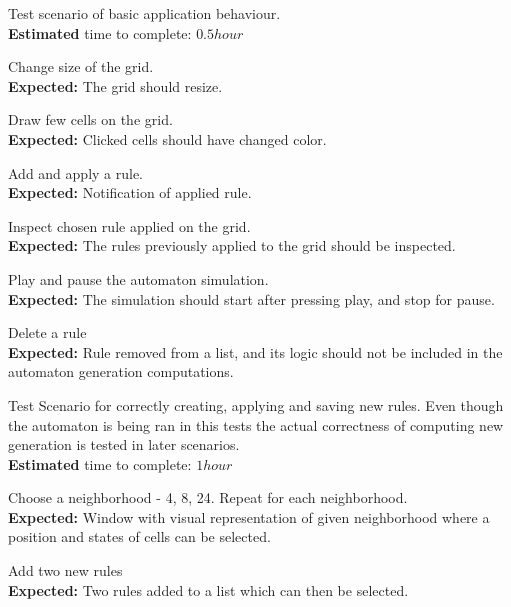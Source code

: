 \documentclass{article}
\begin{document}
\begin{legal}


	\item Test scenario of basic application behaviour. 
	\\ {\bf Estimated} time to complete: $0.5 hour$
	\begin{legal}
		\item Change size of the grid.
		\\{\bf Expected:} The grid should resize.
		
		\item Draw few cells on the grid.
		\\{\bf Expected:} Clicked cells should have changed color.
		
		\item Add and apply a rule.
		\\{\bf Expected:} Notification of applied rule.

		\item Inspect chosen rule applied on the grid.
		\\{\bf Expected:} The rules previously applied to the grid
		should be inspected.
		
		\item Play and pause the automaton simulation.
		\\{\bf Expected:} The simulation should start after
		pressing play, and stop for pause.
		
		\item Delete a rule
		\\{\bf Expected:} Rule removed from a list, and its logic should not be included in the automaton generation computations.
	\end{legal}
	
	
	\item Test Scenario for correctly creating, applying and saving new rules.
	Even though the automaton is being ran in this tests the actual correctness of computing new generation	is tested in later scenarios.
	\\ {\bf Estimated} time to complete: $1 hour$
	
	\begin{legal} 
		\item 
		Choose a neighborhood - 4, 8, 24.
		Repeat for each neighborhood.
 		\\{\bf Expected:} Window with visual representation of given 
		neighborhood where a position and states of cells can be selected.
		
		\item Add two new rules
		\\{\bf Expected:} Two rules added to a list which can then be selected.
		

\end{legal}
\end{legal}
\end{document}

